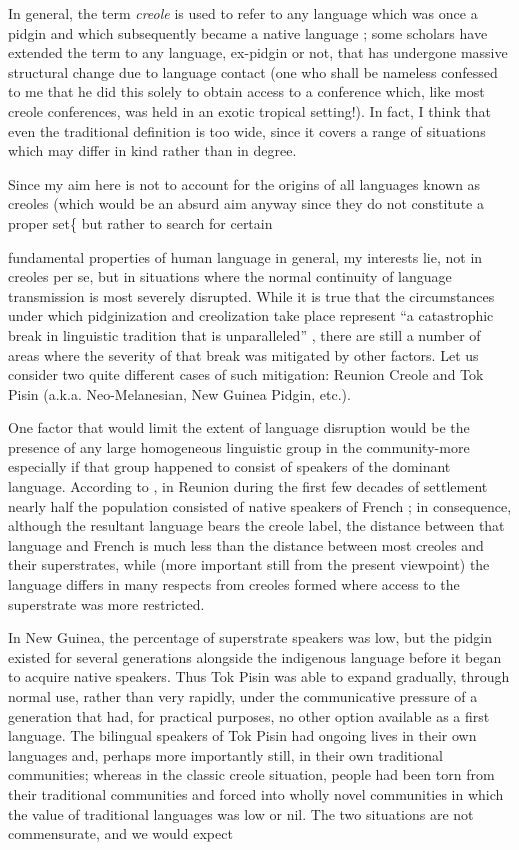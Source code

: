 In general, the term \textit{creole} is used to refer to any language which was once a pidgin and which subsequently became a native language ; some scholars have extended the term to any language, ex-pidgin or not, that has undergone massive structural change due to language contact (one who shall be nameless confessed to me that he did this solely to obtain access to a conference which, like most creole conferences, was held in an exotic tropical setting!). In fact, I think that even the traditional definition is too wide, since it covers a range of situations which may differ in kind rather than in degree.

Since my aim here is not to account for the origins of all lan\-guages known as creoles (which would be an absurd aim anyway since they do not constitute a proper set\{ but rather to search for certain

fundamental properties of human language in general, my interests lie, not in creoles per se, but in situations where the normal continuity of language transmission is most severely disrupted. While it is true that the circumstances under which pidginization and creolization take place represent ``a catastrophic break in linguistic tradition that is unparalleled'' \citep[24]{Sankoff1979}, there are still a number of areas where the severity of that break was mitigated by other factors. Let us consider two quite different cases of such mitigation: Reunion Creole and Tok Pisin (a.k.a. Neo-Melanesian, New Guinea Pidgin, etc.).

One factor that would limit the extent of language disruption would be the presence of any large homogeneous linguistic group in the community-more especially if that group happened to consist of speakers of the dominant language. According to \citet{Chaudenson1974}, in Reunion during the first few decades of settlement nearly half the population consisted of native speakers of French ; in conse\-quence, although the resultant language bears the creole label, the distance between that language and French is much less than the distance between most creoles and their superstrates, while (more important still from the present viewpoint) the language differs in many respects from creoles formed where access to the superstrate was more restricted.

In New Guinea, the percentage of superstrate speakers was low, but the pidgin existed for several generations alongside the indigenous language before it began to acquire native speakers. Thus Tok Pisin was able to expand gradually, through normal use, rather than very rapidly, under the communicative pressure of a generation that had, for practical purposes, no other option available as a first language. The bilingual speakers of Tok Pisin had ongoing lives in their own languages and, perhaps more importantly still, in their own traditional communities; whereas in the classic creole situation, people had been torn from their traditional communities and forced into wholly novel communities in which the value of traditional languages was low or nil. The two situations are not commensurate, and we would expect






